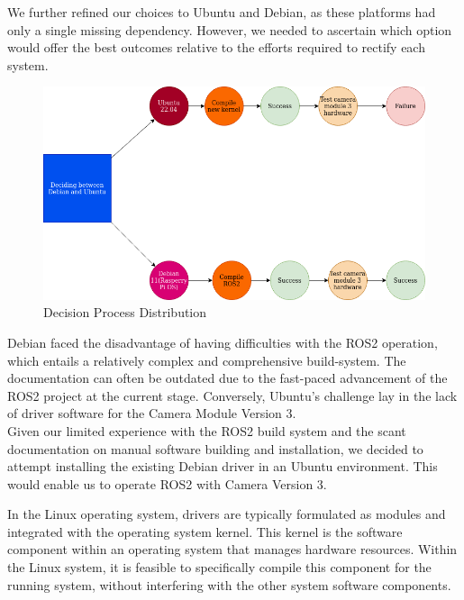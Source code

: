 We further refined our choices to Ubuntu and Debian, as these platforms had only a single missing dependency. However, we needed to ascertain which option would offer the best outcomes relative to the efforts required to rectify each system.\\

\begin{figure}[H]
\centering
\includegraphics[scale=0.5]{fig/select_dist.png}
\caption{Decision Process Distribution}
\label{fig:distselect}
\end{figure}

Debian faced the disadvantage of having difficulties with the ROS2 operation, which entails a relatively complex and comprehensive build-system. The documentation can often be outdated due to the fast-paced advancement of the ROS2 project at the current stage. Conversely, Ubuntu's challenge lay in the lack of driver software for the Camera Module Version 3.\\

Given our limited experience with the ROS2 build system and the scant documentation on manual software building and installation, we decided to attempt installing the existing Debian driver in an Ubuntu environment. This would enable us to operate ROS2 with Camera Version 3.\\

\newpage

In the Linux operating system, drivers are typically formulated as modules and integrated with the operating system kernel. This kernel is the software component within an operating system that manages hardware resources. Within the Linux system, it is feasible to specifically compile this component for the running system, without interfering with the other system software components.\\

